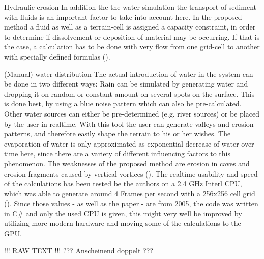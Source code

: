 Hydraulic erosion
In addition the the water-simulation the transport of sediment with fluids is an important factor to take into account here. In the proposed method a fluid as well as a terrain-cell is assigned a capacity constraint, in order to determine if dissolvement or deposition of material may be occurring. If that is the case, a calculation has to be done with very flow from one grid-cell to another with specially defined formulas ().

(Manual) water distribution
The actual introduction of water in the system can be done in two different ways:
Rain can be simulated by generating water and dropping it on random or constant amount on several spots on the surface. This is done best, by using a blue noise pattern which can also be pre-calculated.
Other water sources can either be pre-determined (e.g. river sources) or be placed by the user in realtime. With this tool the user can generate valleys and erosion patterns, and therefore easily shape the terrain to his or her wishes.
The evaporation of water is only approximated as exponential decrease of water over time here, since there are a variety of different influencing factors to this phenomenon. The weaknesses of the proposed method are erosion in caves and erosion fragments caused by vertical vortices ().
The realtime-usability and speed of the calculations has been tested be the authors on a 2.4 GHz Interl CPU, which was able to generate around 4 Frames per second with a 256x256 cell grid (). Since those values - as well as the paper -  are from 2005, the code was written in C# and only the used CPU is given, this might very well be improved by utilizing more modern hardware and moving some of the calculations to the GPU.

!!! RAW TEXT !!!
??? Anscheinend doppelt ???


